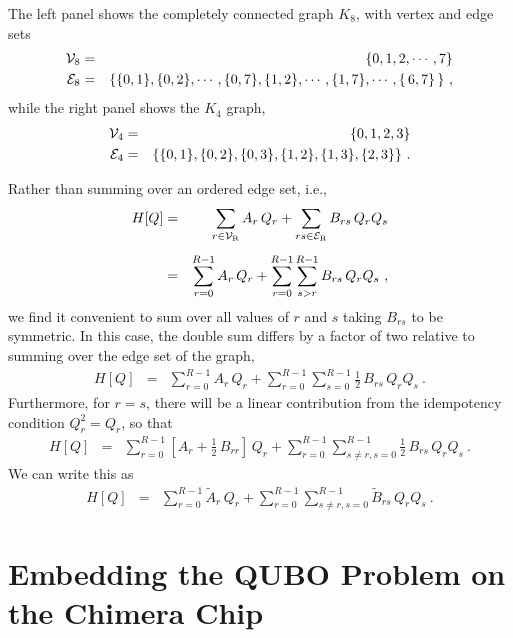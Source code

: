 \documentclass[preprint,12pt,eqsecnum,nofootinbib,amsmath,amssymb]{revtex4}
\newcommand{\smR}{{\rm\scriptscriptstyle R}}
\begin{document}
%
The left panel shows 
the completely connected graph $K_8$, with vertex and  edge sets 
%
\begin{eqnarray}
  {\cal V}_8 &=& \{0, 1, 2, \cdots, 7 \}
  \\
  {\cal E}_8 &=& 
  \{ \{ 0, 1 \}, \{ 0, 2 \},  \cdots , \{ 0 , 7\} ,  \{ 1, 2 \} , \cdots,  \{ 1, 7\} , 
  \cdots,  \{\, 6 , 7\}\, \}
  \ ,
  \nonumber \\
\end{eqnarray}
%
while the right panel shows the $K_4$ graph, 
%
\begin{eqnarray}
  {\cal V}_4 &=& \{0, 1, 2, 3 \}
  \\
  {\cal E}_4 &=& \{  \{ 0, 1\}, \{ 0, 2\}, \{ 0, 3\}, \{ 1, 2\}, \{ 1, 3\}, \{ 2, 3\}    \} 
  \ .
\end{eqnarray}
%

Rather than summing over an ordered edge set, i.e., 
%
\begin{eqnarray}
  H[Q] 
  &=&
  \sum_{r \in {\cal V}_\smR} A_r \, Q_r
  +
  \sum_{rs \in {\cal E}_\smR  }  B_{rs} \, Q_r Q_s
  \\[5pt]
  &=&
  \sum_{r=0}^{R-1} A_r\, Q_r
  +
  \sum_{r=0}^{R-1}  \sum_{s > r}^{R-1} B_{r s} \, Q_r Q_s
  \ ,
\end{eqnarray}
%
we find it convenient to sum over all values of $r$ and $s$ taking $B_{rs}$ to be symmetric. 
In this case, the double sum differs by a factor of two relative to summing over the edge 
set of the graph, 
%
\begin{eqnarray}
  H[Q] 
  &=&
  \sum_{r=0}^{R-1} A_r\, Q_r
  +
  \sum_{r=0}^{R-1}  \sum_{s = 0}^{R-1} \frac{1}{2}\, B_{r s} \, Q_r Q_s
  \ .
\end{eqnarray}
%
Furthermore, for $r = s$, there will be a linear contribution from the idempotency 
condition $Q_r^2 = Q_r$, so that
%
\begin{eqnarray}
  H[Q] 
  &=&
  \sum_{r=0}^{R-1} \left [A_r  + \frac{1}{2}\,B_{rr} \right]\, Q_r
  +
  \sum_{r=0}^{R-1}  \sum_{s \ne r , s=0}^{R-1} 
  \frac{1 }{2}\, B_{r s} \, Q_r Q_s
  \ .
\end{eqnarray}
%
We can write this as 
%
\begin{eqnarray}
  H[Q] 
  &=&
  \sum_{r=0}^{R-1}  \tilde A_r\, Q_r
  +
  \sum_{r=0}^{R-1}  \sum_{s \ne r , s=0}^{R-1} 
  \tilde B_{r s} \, Q_r Q_s
  \ .
\end{eqnarray}
%
%


%
\section{Embedding the QUBO Problem on the Chimera Chip}
\label{sec_embedding}
\end{document}
